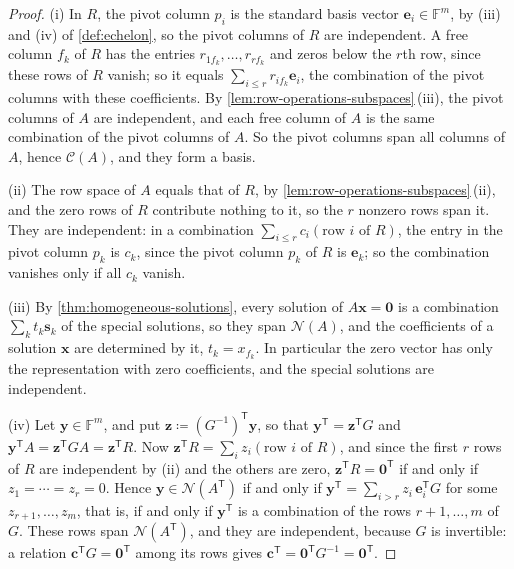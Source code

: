 \begin{proof}
(i) In $R$, the pivot column $p_i$ is the standard basis vector $\mathbf e_i\in\mathbb F^m$, by (iii) and (iv) of \cref{def:echelon}, so the pivot columns of $R$ are independent. A free column $f_k$ of $R$ has the entries $r_{1f_k},\ldots,r_{rf_k}$ and zeros below the $r$th row, since these rows of $R$ vanish; so it equals $\sum_{i\le r}r_{if_k}\mathbf e_i$, the combination of the pivot columns with these coefficients. By \cref{lem:row-operations-subspaces}\,(iii), the pivot columns of $A$ are independent, and each free column of $A$ is the same combination of the pivot columns of $A$. So the pivot columns span all columns of $A$, hence $\mathcal C(A)$, and they form a basis.

(ii) The row space of $A$ equals that of $R$, by \cref{lem:row-operations-subspaces}\,(ii), and the zero rows of $R$ contribute nothing to it, so the $r$ nonzero rows span it. They are independent: in a combination $\sum_{i\le r}c_i(\text{row }i\text{ of }R)$, the entry in the pivot column $p_k$ is $c_k$, since the pivot column $p_k$ of $R$ is $\mathbf e_k$; so the combination vanishes only if all $c_k$ vanish.

(iii) By \cref{thm:homogeneous-solutions}, every solution of $A\mathbf x=\mathbf 0$ is a combination $\sum_kt_k\mathbf s_k$ of the special solutions, so they span $\mathcal N(A)$, and the coefficients of a solution $\mathbf x$ are determined by it, $t_k=x_{f_k}$. In particular the zero vector has only the representation with zero coefficients, and the special solutions are independent.

(iv) Let $\mathbf y\in\mathbb F^m$, and put $\mathbf z\coloneqq(G^{-1})^{\mathsf T}\mathbf y$, so that $\mathbf y^{\mathsf T}=\mathbf z^{\mathsf T}G$ and $\mathbf y^{\mathsf T}A=\mathbf z^{\mathsf T}GA=\mathbf z^{\mathsf T}R$. Now $\mathbf z^{\mathsf T}R=\sum_iz_i(\text{row }i\text{ of }R)$, and since the first $r$ rows of $R$ are independent by (ii) and the others are zero, $\mathbf z^{\mathsf T}R=\mathbf 0^{\mathsf T}$ if and only if $z_1=\cdots=z_r=0$. Hence $\mathbf y\in\mathcal N(A^{\mathsf T})$ if and only if $\mathbf y^{\mathsf T}=\sum_{i>r}z_i\,\mathbf e_i^{\mathsf T}G$ for some $z_{r+1},\ldots,z_m$, that is, if and only if $\mathbf y^{\mathsf T}$ is a combination of the rows $r+1,\ldots,m$ of $G$. These rows span $\mathcal N(A^{\mathsf T})$, and they are independent, because $G$ is invertible: a relation $\mathbf c^{\mathsf T}G=\mathbf 0^{\mathsf T}$ among its rows gives $\mathbf c^{\mathsf T}=\mathbf 0^{\mathsf T}G^{-1}=\mathbf 0^{\mathsf T}$.
\end{proof}

